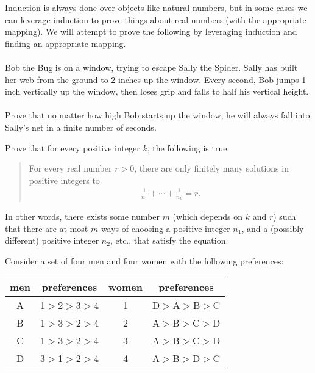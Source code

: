 
Induction is always done over objects like natural numbers, but in some cases we can leverage induction to prove things about real numbers (with the appropriate mapping). We will attempt to prove the following by leveraging induction and finding an appropriate mapping. \\ \\

Bob the Bug is on a window, trying to escape Sally the Spider. Sally has built her web from the ground to 2 inches up the window. Every second, Bob jumps 1 inch vertically up the window, then loses grip and falls to half his vertical height. \\ \\

Prove that no matter how high Bob starts up the window, he will always fall into Sally's net in a finite number of seconds.



Prove that for every positive integer $k$, the following is true:\begin{quote}For every real number $r>0$, there are only finitely many solutions in positive integers to
\begin{align*}
\frac{1}{n_1}+\cdots+\frac{1}{n_k}=r.
\end{align*}
\end{quote}In other words, there exists some number $m$ (which depends on $k$ and $r$) such that there are at most $m$ ways of choosing a positive integer $n_1$, and a (possibly different) positive integer $n_2$, etc., that satisfy the equation.



Consider a set of four men and four women with the following preferences:

\begin{center}
\begin{tabular}{|c|c||c|c|}\hline
men&preferences&women & preferences \\
\hline
A& 1$>$2$>$3$>$4&1& D$>$A$>$B$>$C \\
\hline
B&1$>$3$>$2$>$4 &2& A$>$B$>$C$>$D  \\
\hline
C&1$>$3$>$2$>$4 &3& A$>$B$>$C$>$D  \\
\hline
D&3$>$1$>$2$>$4 &4& A$>$B$>$D$>$C  \\
\hline
\end{tabular}
\end{center}

